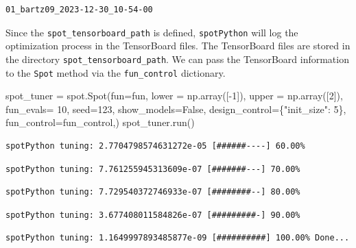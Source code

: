 \documentclass[
  letterpaper,
  DIV=11,
  numbers=noendperiod]{scrreprt}
\newenvironment{Shaded}{\begin{snugshade}}{\end{snugshade}}
\newcommand{\DecValTok}[1]{\textcolor[rgb]{0.68,0.00,0.00}{#1}}
\newcommand{\NormalTok}[1]{\textcolor[rgb]{0.00,0.23,0.31}{#1}}
\newcommand{\OperatorTok}[1]{\textcolor[rgb]{0.37,0.37,0.37}{#1}}
\newcommand{\StringTok}[1]{\textcolor[rgb]{0.13,0.47,0.30}{#1}}
\newcommand{\VariableTok}[1]{\textcolor[rgb]{0.07,0.07,0.07}{#1}}
\begin{document}
\begin{verbatim}
01_bartz09_2023-12-30_10-54-00
\end{verbatim}

Since the \texttt{spot\_tensorboard\_path} is defined,
\texttt{spotPython} will log the optimization process in the TensorBoard
files. The TensorBoard files are stored in the directory
\texttt{spot\_tensorboard\_path}. We can pass the TensorBoard
information to the \texttt{Spot} method via the \texttt{fun\_control}
dictionary.

\begin{Shaded}
\begin{Highlighting}[]
\NormalTok{spot\_tuner }\OperatorTok{=}\NormalTok{ spot.Spot(fun}\OperatorTok{=}\NormalTok{fun,}
\NormalTok{                   lower }\OperatorTok{=}\NormalTok{ np.array([}\OperatorTok{{-}}\DecValTok{1}\NormalTok{]),}
\NormalTok{                   upper }\OperatorTok{=}\NormalTok{ np.array([}\DecValTok{2}\NormalTok{]),}
\NormalTok{                   fun\_evals}\OperatorTok{=} \DecValTok{10}\NormalTok{,}
\NormalTok{                   seed}\OperatorTok{=}\DecValTok{123}\NormalTok{,}
\NormalTok{                   show\_models}\OperatorTok{=}\VariableTok{False}\NormalTok{,}
\NormalTok{                   design\_control}\OperatorTok{=}\NormalTok{\{}\StringTok{"init\_size"}\NormalTok{: }\DecValTok{5}\NormalTok{\},}
\NormalTok{                   fun\_control}\OperatorTok{=}\NormalTok{fun\_control,)}
\NormalTok{spot\_tuner.run()}
\end{Highlighting}
\end{Shaded}

\begin{verbatim}
spotPython tuning: 2.7704798574631272e-05 [######----] 60.00% 
\end{verbatim}

\begin{verbatim}
spotPython tuning: 7.761255945313609e-07 [#######---] 70.00% 
\end{verbatim}

\begin{verbatim}
spotPython tuning: 7.729540372746933e-07 [########--] 80.00% 
\end{verbatim}

\begin{verbatim}
spotPython tuning: 3.677408011584826e-07 [#########-] 90.00% 
\end{verbatim}

\begin{verbatim}
spotPython tuning: 1.1649997893485877e-09 [##########] 100.00% Done...
\end{verbatim}
\end{document}
